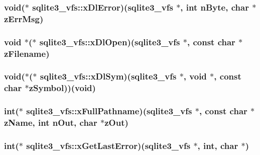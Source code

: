 \hypertarget{structsqlite3__vfs_a3cda3a00a43861cef4d5554354cdfda4}{
\subsubsection[{x\-Dl\-Error}]{\setlength{\rightskip}{0pt plus 5cm}void($\ast$ sqlite3\-\_\-vfs\-::x\-Dl\-Error)({\bf sqlite3\-\_\-vfs} $\ast$, int n\-Byte, char $\ast$z\-Err\-Msg)}}\label{structsqlite3__vfs_a3cda3a00a43861cef4d5554354cdfda4}
\hypertarget{structsqlite3__vfs_ad6587e730f4f8bce2b0129664a9a86b9}{
\subsubsection[{x\-Dl\-Open}]{\setlength{\rightskip}{0pt plus 5cm}void $\ast$($\ast$ sqlite3\-\_\-vfs\-::x\-Dl\-Open)({\bf sqlite3\-\_\-vfs} $\ast$, const char $\ast$z\-Filename)}}\label{structsqlite3__vfs_ad6587e730f4f8bce2b0129664a9a86b9}
\hypertarget{structsqlite3__vfs_a20ef3dacb974e3e480782629cbbf7534}{
\subsubsection[{x\-Dl\-Sym}]{\setlength{\rightskip}{0pt plus 5cm}void($\ast$($\ast$ sqlite3\-\_\-vfs\-::x\-Dl\-Sym)({\bf sqlite3\-\_\-vfs} $\ast$, void $\ast$, const char $\ast$z\-Symbol))(void)}}\label{structsqlite3__vfs_a20ef3dacb974e3e480782629cbbf7534}
\hypertarget{structsqlite3__vfs_a02fafc56d26adab5f236df6493a8bd55}{
\subsubsection[{x\-Full\-Pathname}]{\setlength{\rightskip}{0pt plus 5cm}int($\ast$ sqlite3\-\_\-vfs\-::x\-Full\-Pathname)({\bf sqlite3\-\_\-vfs} $\ast$, const char $\ast${\bf z\-Name}, int n\-Out, char $\ast$z\-Out)}}\label{structsqlite3__vfs_a02fafc56d26adab5f236df6493a8bd55}
\hypertarget{structsqlite3__vfs_a4994110c79d082f7770ce553d507748f}{
\subsubsection[{x\-Get\-Last\-Error}]{\setlength{\rightskip}{0pt plus 5cm}int($\ast$ sqlite3\-\_\-vfs\-::x\-Get\-Last\-Error)({\bf sqlite3\-\_\-vfs} $\ast$, int, char $\ast$)}}\label{structsqlite3__vfs_a4994110c79d082f7770ce553d507748f}
